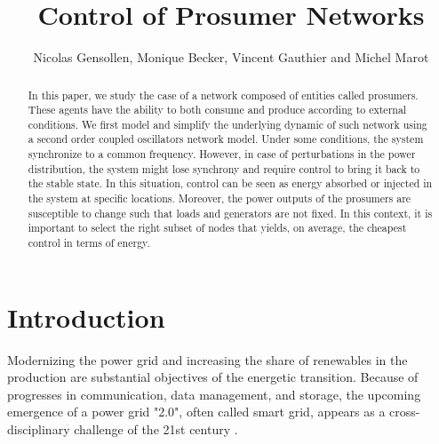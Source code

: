 \documentclass[conference]{IEEEtran}
\begin{document}
\pagestyle{plain}
\title{Control of Prosumer Networks}


\author{Nicolas Gensollen, Monique Becker, Vincent Gauthier and Michel Marot  \\
}


\maketitle


\begin{abstract}

In this paper, we study the case of a network composed of entities called prosumers. These agents have the ability to both consume and produce according to external conditions. We first model and simplify the underlying dynamic of such network using a second order coupled oscillators network model. Under some conditions, the system synchronize to a common frequency. However, in case of perturbations in the power distribution, the system might lose synchrony and require control to bring it back to the stable state. In this situation, control can be seen as energy  absorbed or injected in the system at specific locations. Moreover, the power outputs of the prosumers are susceptible to change such that loads and generators are not fixed. In this context, it is important to select the right subset of nodes that yields, on average, the cheapest control in terms of energy. 
\end{abstract}


\IEEEpeerreviewmaketitle


\section{Introduction}
\label{sec:introduction}

Modernizing the power grid and increasing the share of renewables in the production are substantial objectives of the energetic transition. Because of progresses in communication, data management, and storage, the upcoming emergence of a power grid "2.0", often called smart grid, appears as a cross-disciplinary challenge of the 21st century \cite{Ramchurn}.
\end{document}
